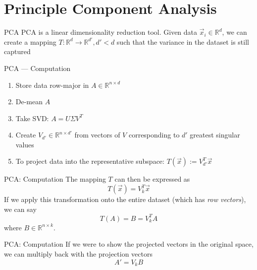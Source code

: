 
	\section{Principle Component Analysis}

	\begin{frame}{PCA}
	PCA is a linear dimensionality reduction tool. Given data $\vec{x}_i \in \mathbb{R}^d$, we can create a mapping $T : \mathbb{R}^d \rightarrow \mathbb{R}^{d'}, d' < d$ such that the variance in the dataset is still captured
	\end{frame}

	\begin{frame}{PCA --- Computation}
		\begin{enumerate}[<+->]
			\item Store data row-major in $A \in \mathbb{R}^{n \times d}$
			\item De-mean $A$
			\item Take SVD: $A = U \Sigma V^T$
			\item Create $V_{d'} \in \mathbb{R}^{n \times d'}$ from vectors of $V$ corresponding to $d'$ greatest singular values
			\item To project data into the representative subspace: $T(\vec{x}) := V_{d'}^T \vec{x}$
		\end{enumerate}
	\end{frame}

	\begin{frame}{PCA: Computation}
	The mapping $T$ can then be expressed as
	\[ T(\vec{x}) = V_k^T \vec{x} \]
	If we apply this transformation onto the entire dataset (which has \emph{row vectors}), we can say
	\[ T(A) = B = V_k^T A\]
	where $B \in \mathbb{R}^{n \times k}$.
	\end{frame}
	\begin{frame}{PCA: Computation}
	If we were to show the projected vectors in the original space, we can multiply back with the projection vectors
	\[ A' = V_k B \]
	\end{frame}

